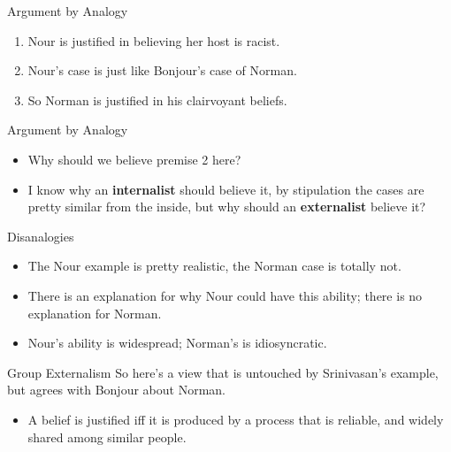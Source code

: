 \documentclass[
  17pt,
  letterpaper,
  ignorenonframetext,
  aspectratio=169,
  handout]{beamer}
\providecommand{\tightlist}{%
  \setlength{\itemsep}{0pt}\setlength{\parskip}{0pt}}\usepackage{longtable,booktabs,array}
\begin{document}
\begin{frame}{Argument by Analogy}
\protect\hypertarget{argument-by-analogy}{}
\begin{enumerate}[<+->]
\tightlist
\item
  Nour is justified in believing her host is racist.
\item
  Nour's case is just like Bonjour's case of Norman.
\item
  So Norman is justified in his clairvoyant beliefs.
\end{enumerate}
\end{frame}

\begin{frame}{Argument by Analogy}
\protect\hypertarget{argument-by-analogy-1}{}
\begin{itemize}[<+->]
\tightlist
\item
  Why should we believe premise 2 here?
\item
  I know why an \textbf{internalist} should believe it, by stipulation
  the cases are pretty similar from the inside, but why should an
  \textbf{externalist} believe it?
\end{itemize}
\end{frame}

\begin{frame}{Disanalogies}
\protect\hypertarget{disanalogies}{}
\begin{itemize}[<+->]
\tightlist
\item
  The Nour example is pretty realistic, the Norman case is totally not.
\item
  There is an explanation for why Nour could have this ability; there is
  no explanation for Norman.
\item
  Nour's ability is widespread; Norman's is idiosyncratic.
\end{itemize}
\end{frame}

\begin{frame}{Group Externalism}
\protect\hypertarget{group-externalism}{}
So here's a view that is untouched by Srinivasan's example, but agrees
with Bonjour about Norman.

\begin{itemize}[<+->]
\tightlist
\item
  A belief is justified iff it is produced by a process that is
  reliable, and widely shared among similar people.
\end{itemize}
\end{frame}
\end{document}
